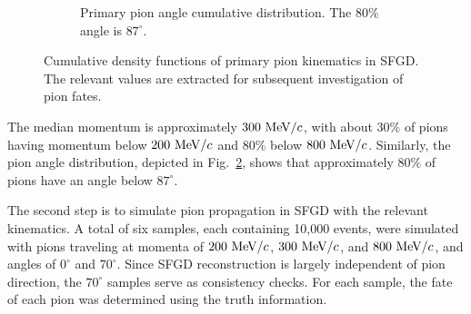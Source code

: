 \begin{figure}[t]
\begin{subfigure}{\dbfigwid\textwidth}
                    \caption{Primary pion angle cumulative distribution. The $80\%$ angle is $87^\circ$.}
                    \label{subfig:pi-theta-cum}
               \end{subfigure}
               \caption{Cumulative density functions of primary pion kinematics in SFGD. The relevant values are extracted for subsequent investigation of pion fates.}
          \end{figure}
               
          The median momentum is approximately $300~\textrm{MeV}/c$, with about $30\%$ of pions having momentum below $200~\textrm{MeV}/c$ and $80\%$ below $800~\textrm{MeV}/c$. 
          Similarly, the pion angle distribution, depicted in Fig.~\ref{subfig:pi-theta-cum}, shows that approximately $80\%$ of pions have an angle below $87^\circ$.

          The second step is to simulate pion propagation in SFGD with the relevant kinematics. 
          A total of six samples, each containing 10,000 events, were simulated with pions traveling at momenta of $200~\textrm{MeV}/c$, $300~\textrm{MeV}/c$, and $800~\textrm{MeV}/c$, and angles of $0^\circ$ and $70^\circ$. 
          Since SFGD reconstruction is largely independent of pion direction, the $70^\circ$ samples serve as consistency checks. 
          For each sample, the fate of each pion was determined using the truth information.


